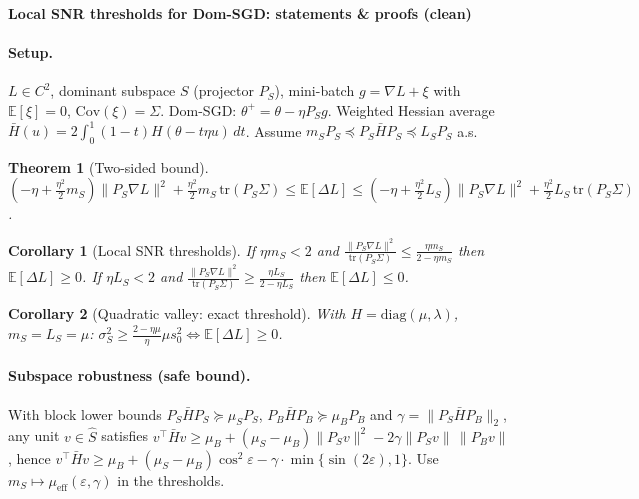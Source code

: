 \documentclass[10pt]{article}
\newtheorem{theorem}{Theorem}
\newtheorem{corollary}{Corollary}
\begin{document}
\small
\begin{center}
{\Large \textbf{Local SNR thresholds for Dom-SGD: statements \& proofs (clean)}}\\[2mm]
\end{center}
\paragraph{Setup.} $L\in C^2$, dominant subspace $S$ (projector $P_S$), mini-batch $g=\nabla L+\xi$ with $\mathbb E[\xi]=0$, $\mathrm{Cov}(\xi)=\Sigma$. Dom-SGD: $\theta^+=\theta-\eta P_S g$. Weighted Hessian average
$\bar H(u)=2\!\int_0^1(1-t)H(\theta-t\eta u)\,dt$. Assume $m_S P_S\preceq P_S\bar H P_S\preceq L_S P_S$ a.s.
\begin{theorem}[Two-sided bound]
$\left(-\eta+\frac{\eta^2}{2}m_S\right)\|P_S\nabla L\|^2+\frac{\eta^2}{2}m_S\,\mathrm{tr}(P_S\Sigma)\le
\mathbb E[\Delta L]\le
\left(-\eta+\frac{\eta^2}{2}L_S\right)\|P_S\nabla L\|^2+\frac{\eta^2}{2}L_S\,\mathrm{tr}(P_S\Sigma)$.
\end{theorem}
\begin{corollary}[Local SNR thresholds]
If $\eta m_S<2$ and $\frac{\|P_S\nabla L\|^2}{\mathrm{tr}(P_S\Sigma)}\le\frac{\eta m_S}{2-\eta m_S}$ then $\mathbb E[\Delta L]\ge0$.
If $\eta L_S<2$ and $\frac{\|P_S\nabla L\|^2}{\mathrm{tr}(P_S\Sigma)}\ge\frac{\eta L_S}{2-\eta L_S}$ then $\mathbb E[\Delta L]\le0$.
\end{corollary}
\begin{corollary}[Quadratic valley: exact threshold]
With $H=\mathrm{diag}(\mu,\lambda)$, $m_S=L_S=\mu$: $\sigma_S^2\ge \frac{2-\eta\mu}{\eta}\mu s_0^2\iff \mathbb E[\Delta L]\ge0$.
\end{corollary}
\paragraph{Subspace robustness (safe bound).} With block lower bounds $P_S\bar H P_S\succeq\mu_S P_S$, $P_B\bar H P_B\succeq\mu_B P_B$ and $\gamma=\|P_S\bar H P_B\|_2$, any unit $v\in\widehat S$ satisfies
$v^\top\bar H v\ge \mu_B+(\mu_S-\mu_B)\|P_S v\|^2-2\gamma\|P_S v\|\,\|P_B v\|$, hence
$v^\top\bar H v\ge \mu_B+(\mu_S-\mu_B)\cos^2\varepsilon-\gamma\cdot\min\{\sin(2\varepsilon),1\}$.
Use $m_S\mapsto \mu_{\mathrm{eff}}(\varepsilon,\gamma)$ in the thresholds.
\end{document}

